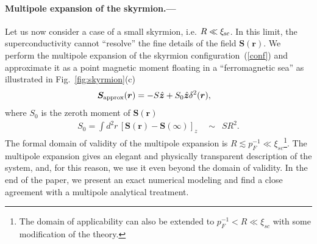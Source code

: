 \documentclass[twocolumn,showpacs,floatfix,longbibliography]{revtex4-1}
\begin{document}
\paragraph*{Multipole expansion of the skyrmion.---} \label{sec:analytics}
Let us now consider a case of a small skyrmion, i.e. $R\ll\xi_{\rm sc}$. In this limit, the superconductivity cannot ``resolve'' the fine details of the field $\bm S(\bm r)$. We perform the multipole expansion of the skyrmion configuration~(\ref{conf}) and approximate it as a point magnetic moment floating in a ``ferromagnetic sea'' as illustrated in Fig.~\ref{fig:skyrmion}(c)
\begin{align}
	\bm S_{\rm approx}(\bm r) & =  - S \hat{\bm z} + S_0 \hat{\bm z} \delta^2(\bm r),  \label{vr}
\end{align}
where $S_0$ is the zeroth moment of $\bm S(\bm r)$
\begin{align}
	S_0 = \int  d^2r \, \left[\bm S(\bm r)-\bm S(\infty)\right]_z  \quad \sim \,\,\,SR^2. \label{S0}
\end{align}
The formal domain of validity of the multipole expansion is $R \lesssim p_F^{-1} \ll \xi_{sc}$\footnote{The domain of applicability can also be extended to $p_F^{-1}<R\ll \xi_{sc}$ with some modification of the theory.}. The multipole expansion gives an elegant and physically transparent description of the system, and, for this reason, we use it even beyond the domain of validity. In the end of the paper, we present an exact numerical modeling and find a close agreement with a multipole analytical treatment.
\end{document}
